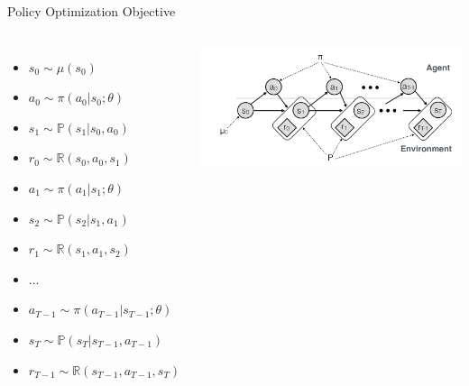 \begin{frame}{Policy Optimization Objective}
\begin{columns}
    \begin{itemize}
        \item[] $s_0 \sim \mu(s_0)$
        \item[] $a_0 \sim \pi(a_0|s_0;\theta)$
        \item[] $s_1 \sim \mathbb{P}(s_1|s_0, a_0)$
        \item[] $r_0 \sim \mathbb{R}(s_0, a_0, s_1)$
        \item[] $a_1 \sim \pi(a_1|s_1;\theta)$
        \item[] $s_2 \sim \mathbb{P}(s_2|s_1, a_1)$
        \item[] $r_1 \sim \mathbb{R}(s_1, a_1, s_2)$
        \item[] ...
        \item[] $a_{T-1} \sim \pi(a_{T-1}|s_{T-1};\theta)$
        \item[] $s_T \sim \mathbb{P}(s_T|s_{T-1}, a_{T-1})$
        \item[] $r_{T-1} \sim \mathbb{R}(s_{T-1}, a_{T-1}, s_{T})$
    \end{itemize}
    \includegraphics[scale=0.18]{img/trajvis.png}
\end{columns}
\end{frame}
